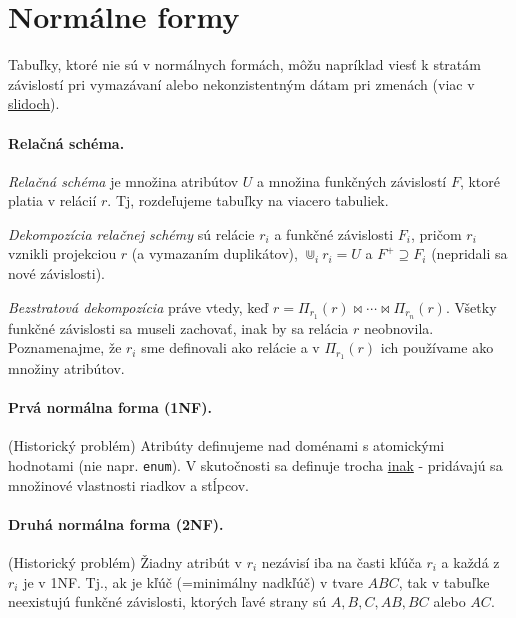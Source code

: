 \documentclass[10pt,a4paper]{article}
\begin{document}
\section{Normálne formy} 

Tabuľky, ktoré nie sú v normálnych formách, môžu napríklad viesť k stratám závislostí pri vymazávaní alebo nekonzistentným dátam pri zmenách (viac v \href{http://www.dcs.fmph.uniba.sk/~plachetk/TEACHING/DB2011/db2011_8.pdf}{slidoch}).

\paragraph{Relačná schéma.}
\emph{Relačná schéma} je množina atribútov $U$ a množina funkčných závislostí $F$, ktoré platia v relácií $r$. Tj, rozdeľujeme tabuľky na viacero tabuliek. 

\emph{Dekompozícia relačnej schémy} sú relácie $r_i$ a funkčné závislosti $F_i$, pričom $r_i$ vznikli projekciou $r$ (a vymazaním duplikátov), $\Cup_i r_i = U$ a $F^+ \supseteq F_i$ (nepridali sa nové závislosti).

\emph{Bezstratová dekompozícia} práve vtedy, keď $r = \Pi_{r_1}(r) \Join \cdots \Join \Pi_{r_n}(r)$. Všetky funkčné závislosti sa museli zachovať, inak by sa relácia $r$ neobnovila. Poznamenajme, že $r_i$ sme definovali ako relácie a v $\Pi_{r_1}(r) $ ich používame ako množiny atribútov. 

\paragraph{Prvá normálna forma (1NF).} (Historický problém) Atribúty definujeme nad doménami s atomickými hodnotami (nie napr. \verb|enum|). V skutočnosti sa definuje trocha \href{http://en.wikipedia.org/wiki/First_normal_form}{inak} - pridávajú sa množinové vlastnosti riadkov a stĺpcov. 

\paragraph{Druhá normálna forma (2NF).} (Historický problém) Žiadny atribút v $r_i$ nezávisí iba na časti kľúča $r_i$ a každá z $r_i$ je v 1NF. Tj., ak je kľúč (=minimálny nadkľúč) v tvare $ABC$, tak v tabuľke neexistujú funkčné závislosti, ktorých ľavé strany sú $A,B,C,AB,BC$ alebo $AC$. 
\end{document}
